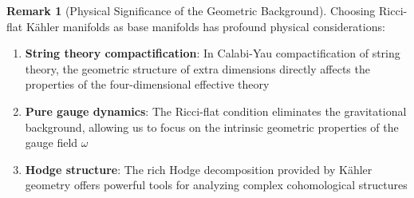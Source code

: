 \documentclass[a4paper,12pt]{extarticle}
\newtheorem{theorem}{Theorem}
\theoremstyle{definition}
\newtheorem{remark}{Remark}
\begin{document}
\begin{remark}[Physical Significance of the Geometric Background]
Choosing Ricci-flat Kähler manifolds as base manifolds has profound physical considerations:
\begin{enumerate}
\item \textbf{String theory compactification}: In Calabi-Yau compactification of string theory, the geometric structure of extra dimensions directly affects the properties of the four-dimensional effective theory
\item \textbf{Pure gauge dynamics}: The Ricci-flat condition eliminates the gravitational background, allowing us to focus on the intrinsic geometric properties of the gauge field $\omega$
\item \textbf{Hodge structure}: The rich Hodge decomposition provided by Kähler geometry offers powerful tools for analyzing complex cohomological structures
\end{enumerate}
\end{remark}






\end{document}
